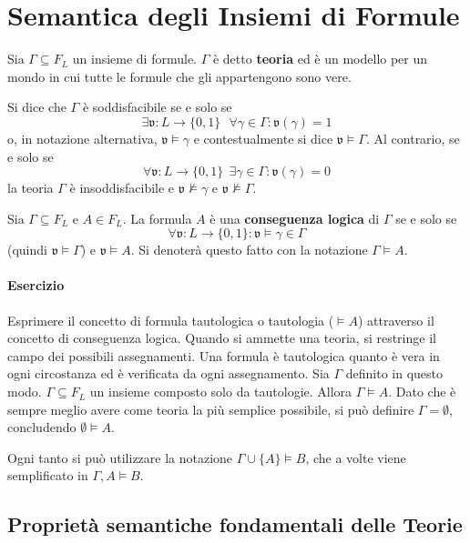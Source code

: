 \section{Semantica degli Insiemi di Formule}
\begin{defi}[Teoria]
Sia $\Gamma \subseteq F_L$ un insieme di formule. $\Gamma$ è detto 
\textbf{teoria} ed è un modello per un mondo in cui tutte le formule che 
gli appartengono sono vere.
\end{defi}
Si dice che $\Gamma$ è soddisfacibile 
se e solo se  
$$
\exists \mathfrak{v}: L \rightarrow \{0,1\} ~~~ \forall \gamma \in \Gamma:\mathfrak{v}(\gamma) = 1
$$
o, in notazione alternativa, $\mathfrak{v} \models \gamma$ e contestualmente 
si dice $\mathfrak{v} \models \Gamma$. Al contrario, se e solo se 
$$
\forall \mathfrak{v}: L \rightarrow \{0,1\} ~~ \exists \gamma \in \Gamma : \mathfrak{v}(\gamma) = 0
$$
la teoria $\Gamma$ è insoddisfacibile e $\mathfrak{v} \nvDash \gamma$ e 
$\mathfrak{v} \nvDash \Gamma$. 

\begin{defi}
Sia $\Gamma \subseteq F_L$ e $A \in F_L$. La formula $A$ è una 
\textbf{conseguenza logica} di $\Gamma$ se e solo se 
$$
\forall \mathfrak{v}: L \rightarrow \{0,1\} : \mathfrak{v} \models\gamma \in \Gamma
$$ 
(quindi $\mathfrak{v} \models\Gamma$) e $\mathfrak{v} \models A$. 
Si denoterà questo fatto con la notazione $\Gamma \models A$.
\end{defi}

\paragraph{Esercizio} 
Esprimere il concetto di formula tautologica o tautologia ($\models A$)
attraverso il concetto di conseguenza logica. 
Quando si ammette una teoria, si restringe il campo dei possibili assegnamenti. 
Una formula è tautologica quanto è vera in ogni circostanza ed è verificata 
da ogni assegnamento. Sia $\Gamma$ definito in questo modo. $\Gamma \subseteq F_L$ 
un insieme composto solo da tautologie. Allora 
$\Gamma \models A$. Dato che è sempre meglio avere come teoria la più semplice 
possibile, si può definire $\Gamma = \emptyset$, concludendo $\emptyset \models A$. 

\noindent
Ogni tanto si può utilizzare la notazione $\Gamma \cup \{A\} \models B$, che 
a volte viene semplificato in $\Gamma,A \models B$. 

\subsection{Proprietà semantiche fondamentali delle Teorie}

